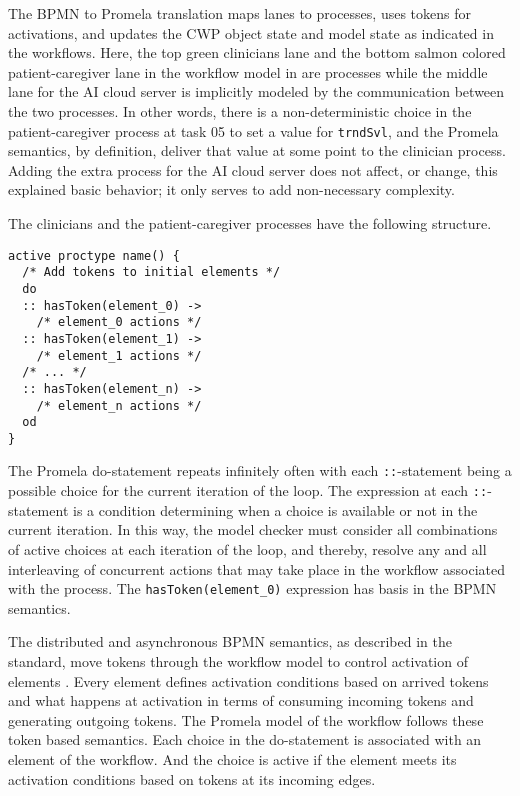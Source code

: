 The BPMN to Promela translation maps lanes to processes, uses tokens for activations, and updates the CWP object state and model state as indicated in the workflows.
Here, the top green clinicians lane and the bottom salmon colored patient-caregiver lane in the workflow model in  are processes while the middle lane for the AI cloud server is implicitly modeled by the communication between the two processes. In other words, there is a non-deterministic choice in the patient-caregiver process at task 05 to set a value for \texttt{trndSvl}, and the Promela semantics, by definition, deliver that value at some point to the clinician process. Adding the extra process for the AI cloud server does not affect, or change, this explained basic behavior; it only serves to add non-necessary complexity.

The clinicians and the patient-caregiver processes have the following structure.
%
{\small
\begin{lstlisting}[style=myPromela]
active proctype name() {
  /* Add tokens to initial elements */
  do
  :: hasToken(element_0) ->
    /* element_0 actions */
  :: hasToken(element_1) ->
    /* element_1 actions */
  /* ... */  
  :: hasToken(element_n) ->
    /* element_n actions */
  od
}
\end{lstlisting}
}
%
\noindent The Promela do-statement repeats infinitely often with each \texttt{::}-statement being a possible choice for the current iteration of the loop. The expression at each \texttt{::}-statement is a condition determining when a choice is available or not in the current iteration. In this way, the model checker must consider all combinations of active choices at each iteration of the loop, and thereby, resolve any and all interleaving of concurrent actions that may take place in the workflow associated with the process. The \texttt{hasToken(element\_0)} expression has basis in the BPMN semantics.

The distributed and asynchronous BPMN semantics, as described in the standard, move tokens through the workflow model to control activation of elements \cite{BPMNSpecification}. Every element defines activation conditions based on arrived tokens and what happens at activation in terms of consuming incoming tokens and generating outgoing tokens. The Promela model of the workflow follows these token based semantics. Each choice in the do-statement is associated with an element of the workflow. And the choice is active if the element meets its activation conditions based on tokens at its incoming edges.

